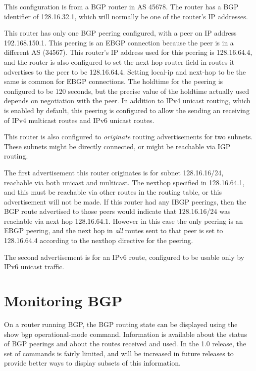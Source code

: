 This configuration is from a BGP router in AS 45678.  The router has a
BGP identifier of 128.16.32.1, which will normally be one of the router's
IP addresses.

This router has only one BGP peering configured, with a peer on IP
address 192.168.150.1.  This peering is an EBGP connection because the
peer is in a different AS (34567).  This router's IP address used for
this peering is 128.16.64.4, and the router is also configured to set
the next hop router field in routes it advertises to the peer to be
128.16.64.4.  Setting local-ip and next-hop to be the same is common
for EBGP connections.  The holdtime for the peering is configured to
be 120 seconds, but the precise value of the holdtime actually used
depends on negotiation with the peer.  In addition to IPv4 unicast
routing, which is enabled by default, this peering is configured to
allow the sending an receiving of IPv4 multicast routes and IPv6
unicast routes.

This router is also configured to {\it originate} routing
advertisements for two subnets.  These subnets might be directly
connected, or might be reachable via IGP routing.

The first advertisement this router originates is for subnet
128.16.16/24, reachable via both unicast and multicast.  The nexthop
specified in 128.16.64.1, and this must be reachable via other routes
in the routing table, or this advertisement will not be made.  If this
router had any IBGP peerings, then the BGP route advertised to those
peers would indicate that 128.16.16/24 was reachable via next hop
128.16.64.1. However in this case the only peering is an EBGP peering,
and the next hop in {\it all} routes sent to that peer is set to
128.16.64.4 according to the {\stt nexthop} directive for the peering.

The second advertisement is for an IPv6 route, configured to be usable
only by IPv6 unicast traffic.

\newpage
\section{Monitoring BGP}

On a router running BGP, the BGP routing state can be displayed using
the {\stt show bgp} operational-mode command.  Information is available
about the status of BGP peerings and about the routes received and
used.  In the 1.0 release, the set of commands is fairly limited, and
will be increased in future releases to provide better ways to display
subsets of this information.

